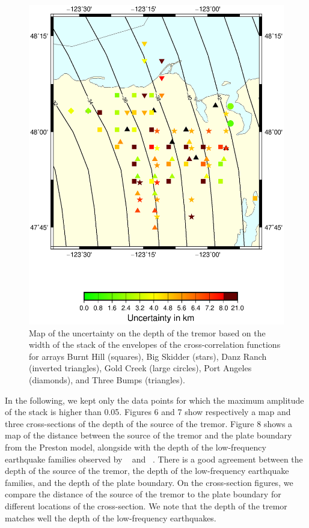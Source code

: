 \documentclass[draft]{agujournal2019}
\begin{document}
\begin{figure}
\noindent\includegraphics[width=\textwidth, trim={1cm 5cm 3.5cm 4cm},clip]{figures/uncertainty_PWS_PWS.eps}
\caption{Map of the uncertainty on the depth of the tremor based on the width of the stack of the envelopes of the cross-correlation functions for arrays Burnt Hill (squares), Big Skidder (stars), Danz Ranch (inverted triangles),  Gold Creek (large circles), Port Angeles (diamonds), and Three Bumps (triangles).}
\label{pngfiguresample}
\end{figure}

In the following, we kept only the data points for which the maximum amplitude of the stack is higher than 0.05. Figures 6 and 7 show respectively a map and three cross-sections of the depth of the source of the tremor. Figure 8 shows a map of the distance between the source of the tremor and the plate boundary from the Preston model, alongside with the depth of the low-frequency earthquake families observed by ~ and ~. There is a good agreement between the depth of the source of the tremor, the depth of the low-frequency earthquake families, and the depth of the plate boundary. On the cross-section figures, we compare the distance of the source of the tremor to the plate boundary for different locations of the cross-section. We note that the depth of the tremor matches well the depth of the low-frequency earthquakes. \\
\end{document}
